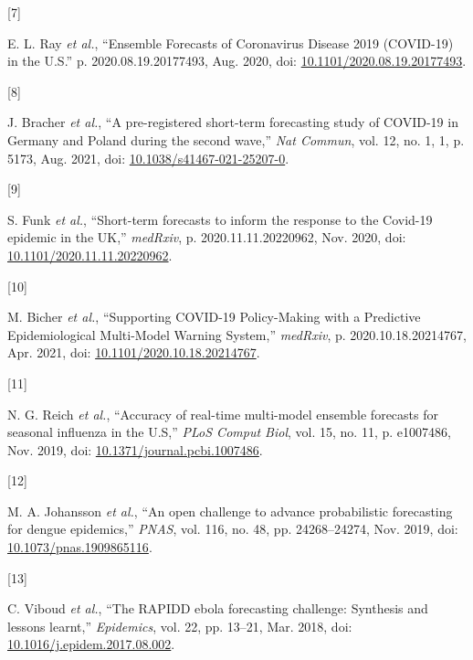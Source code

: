 \documentclass[
]{article}
\newlength{\cslhangindent}
\newlength{\csllabelwidth}
\newlength{\cslentryspacingunit} %
\newenvironment{CSLReferences}[2] %
 {%
  \setlength{\parindent}{0pt}
  \ifodd #1
  \let\oldpar\par
  \def\par{\hangindent=\cslhangindent\oldpar}
  \fi
  \setlength{\parskip}{#2\cslentryspacingunit}
 }%
 {}
\newcommand{\CSLLeftMargin}[1]{\parbox[t]{\csllabelwidth}{#1}}
\newcommand{\CSLRightInline}[1]{\parbox[t]{\linewidth - \csllabelwidth}{#1}\break}
\begin{document}
\begin{CSLReferences}{0}{0}
\leavevmode{}%
\CSLLeftMargin{{[}7{]} }
\CSLRightInline{E. L. Ray \emph{et al.}, {``Ensemble {Forecasts} of
{Coronavirus Disease} 2019 ({COVID-19}) in the {U}.{S}.''} p.
2020.08.19.20177493, Aug. 2020, doi:
\href{https://doi.org/10.1101/2020.08.19.20177493}{10.1101/2020.08.19.20177493}.}

\leavevmode{}%
\CSLLeftMargin{{[}8{]} }
\CSLRightInline{J. Bracher \emph{et al.}, {``A pre-registered short-term
forecasting study of {COVID-19} in {Germany} and {Poland} during the
second wave,''} \emph{Nat Commun}, vol. 12, no. 1, 1, p. 5173, Aug.
2021, doi:
\href{https://doi.org/10.1038/s41467-021-25207-0}{10.1038/s41467-021-25207-0}.}

\leavevmode{}%
\CSLLeftMargin{{[}9{]} }
\CSLRightInline{S. Funk \emph{et al.}, {``Short-term forecasts to inform
the response to the {Covid-19} epidemic in the {UK},''} \emph{medRxiv},
p. 2020.11.11.20220962, Nov. 2020, doi:
\href{https://doi.org/10.1101/2020.11.11.20220962}{10.1101/2020.11.11.20220962}.}

\leavevmode{}%
\CSLLeftMargin{{[}10{]} }
\CSLRightInline{M. Bicher \emph{et al.}, {``Supporting {COVID-19
Policy-Making} with a {Predictive Epidemiological Multi-Model Warning
System},''} \emph{medRxiv}, p. 2020.10.18.20214767, Apr. 2021, doi:
\href{https://doi.org/10.1101/2020.10.18.20214767}{10.1101/2020.10.18.20214767}.}

\leavevmode{}%
\CSLLeftMargin{{[}11{]} }
\CSLRightInline{N. G. Reich \emph{et al.}, {``Accuracy of real-time
multi-model ensemble forecasts for seasonal influenza in the {U}.{S},''}
\emph{PLoS Comput Biol}, vol. 15, no. 11, p. e1007486, Nov. 2019, doi:
\href{https://doi.org/10.1371/journal.pcbi.1007486}{10.1371/journal.pcbi.1007486}.}

\leavevmode{}%
\CSLLeftMargin{{[}12{]} }
\CSLRightInline{M. A. Johansson \emph{et al.}, {``An open challenge to
advance probabilistic forecasting for dengue epidemics,''} \emph{PNAS},
vol. 116, no. 48, pp. 24268--24274, Nov. 2019, doi:
\href{https://doi.org/10.1073/pnas.1909865116}{10.1073/pnas.1909865116}.}

\leavevmode{}%
\CSLLeftMargin{{[}13{]} }
\CSLRightInline{C. Viboud \emph{et al.}, {``The {RAPIDD} ebola
forecasting challenge: {Synthesis} and lessons learnt,''}
\emph{Epidemics}, vol. 22, pp. 13--21, Mar. 2018, doi:
\href{https://doi.org/10.1016/j.epidem.2017.08.002}{10.1016/j.epidem.2017.08.002}.}


\end{CSLReferences}
\end{document}
